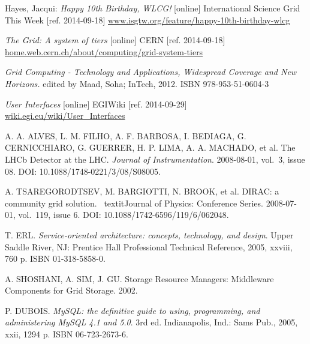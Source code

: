 
\def\bibname{Bibliography}
\begin{thebibliography}{99}
\addcontentsline{toc}{chapter}{\bibname}


	Hayes, Jacqui: 
	\emph{Happy 10th Birthday, WLCG!} [online]
	International Science Grid This Week [ref. 2014-09-18]
	\url{www.isgtw.org/feature/happy-10th-birthday-wlcg}

	\emph{The Grid: A system of tiers} [online] 
	CERN [ref. 2014-09-18]
	\url{home.web.cern.ch/about/computing/grid-system-tiers}

	\emph{Grid Computing - Technology and Applications, Widespread Coverage and New Horizons.} 
	edited by Maad, Soha; InTech, 2012.
	ISBN 978-953-51-0604-3

	\emph{User Interfaces} [online] 
	EGIWiki [ref. 2014-09-29]
	\url{wiki.egi.eu/wiki/User_Interfaces}
	
	A. A. ALVES, L. M. FILHO, A. F. BARBOSA, I. BEDIAGA, G. CERNICCHIARO, G. GUERRER, H. P. LIMA, A. A. MACHADO, et al. 
	The LHCb Detector at the LHC.
	\textit{Journal of Instrumentation}. 
	2008-08-01, vol.~3, issue 08. 
	DOI: 10.1088/1748-0221/3/08/S08005.
	
	A. TSAREGORODTSEV, M. BARGIOTTI, N. BROOK, et al. 
	DIRAC: a community grid solution. \
	textit{Journal of Physics: Conference Series}. 2008-07-01, vol.~119, issue 6.
	DOI: 10.1088/1742-6596/119/6/062048.
	
	T. ERL. 
	\textit{Service-oriented architecture: concepts, technology, and design}. 
	Upper Saddle River, NJ: Prentice Hall Professional Technical Reference, 2005, xxviii, 
	760 p. ISBN 01-318-5858-0.

	
	A. SHOSHANI,  A. SIM, J. GU. 
	Storage Resource Managers: Middleware Components for Grid Storage. 
	2002.
	
	P. DUBOIS. \textit{MySQL: the definitive guide to using, programming, and administering MySQL 4.1 and 5.0}. 
	3rd ed. Indianapolis, Ind.: Sams Pub., 2005, xxii, 1294 p. ISBN 06-723-2673-6.


\end{thebibliography}

